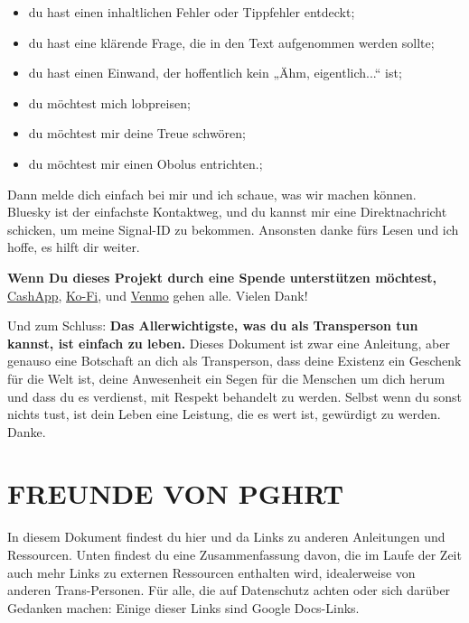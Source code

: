 \documentclass{article}
\begin{document}
{{{\begin{itemize}
\item du hast einen inhaltlichen Fehler oder Tippfehler entdeckt;

\item du hast eine klärende Frage, die in den Text aufgenommen werden sollte;

\item du hast einen Einwand, der hoffentlich kein „Ähm, eigentlich...“ ist;

\item du möchtest mich lobpreisen;

\item du möchtest mir deine Treue schwören; 

\item du möchtest mir einen Obolus entrichten.;
\end{itemize}

Dann melde dich einfach bei mir und ich schaue, was wir machen können. Bluesky ist der einfachste Kontaktweg, und du kannst mir eine Direktnachricht schicken, um meine Signal-ID zu bekommen. Ansonsten danke fürs Lesen und ich hoffe, es hilft dir weiter.
									 
			 

\textbf{Wenn Du dieses Projekt durch eine Spende unterstützen möchtest,} \href{https://cash.app/Katitties}{CashApp}, \href{https://ko-fi.com/katitties}{Ko-Fi}, und \href{https://account.venmo.com/u/katitties}{Venmo} gehen alle. Vielen Dank!

Und zum Schluss: \textbf{Das Allerwichtigste, was du als Transperson tun kannst, ist einfach zu leben.} Dieses Dokument ist zwar eine Anleitung, aber genauso eine Botschaft an dich als Transperson, dass deine Existenz ein Geschenk für die Welt ist, deine Anwesenheit ein Segen für die Menschen um dich herum und dass du es verdienst, mit Respekt behandelt zu werden. Selbst wenn du sonst nichts tust, ist dein Leben eine Leistung, die es wert ist, gewürdigt zu werden. Danke.

\section*{FREUNDE VON PGHRT}\label{FOPGHRT}

In diesem Dokument findest du hier und da Links zu anderen Anleitungen und Ressourcen. Unten findest du eine Zusammenfassung davon, die im Laufe der Zeit auch mehr Links zu externen Ressourcen enthalten wird, idealerweise von anderen Trans-Personen. Für alle, die auf Datenschutz achten oder sich darüber Gedanken machen: Einige dieser Links sind Google Docs-Links.
			 

}}}
\end{document}

